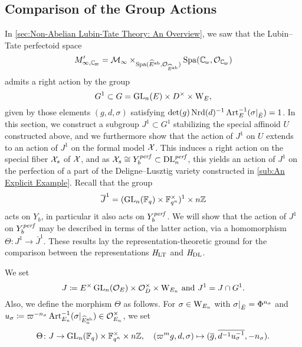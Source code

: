 \documentclass[../main.tex]{subfiles}
\begin{document}

\subsection{Comparison of the Group Actions} %
\label{sub:Proof of Proposition}
In \cref{sec:Non-Abelian Lubin-Tate Theory: An Overview}, we saw that
the Lubin--Tate perfectoid space 
$$M'_{\infty, \Cp} = \cM_{\infty} \times_{\Spa(\hat E^\ab, \cO_{\hat
E^\ab})} \Spa(\Cp, \cO_\Cp)$$ 
admits a right action by the group
\begin{equation*}
  G^1 \subset G = \operatorname{GL}_n(E) \times D^\times \times \mathrm W_E,
\end{equation*}
given by those elements $(g,d,\sigma)$ satisfying $\det(g) \operatorname{Nrd}(d)^{-1} \operatorname{Art}_E^{-1}(\sigma|_{\breve {E}}) = 1$.
In this section, we construct a subgroup $J^1 \subset G^1$ stabilizing the
special affinoid $U$ constructed above, and we furthermore show that 
the action of $J^1$ on $U$ extends to an action of $J^1$ on the formal model
$\mathcal{X}$. This induces a right action on the special fiber
$\mathcal{X}_s$ of $\mathcal{X}$, and as $\mathcal{X}_s \cong Y_b^{\mathit{perf}} \subset \mathrm{DL}_n^{\mathit{perf}}$, this
yields an action of $J^1$ on the perfection of a part of the Deligne--Lusztig
variety constructed in \cref{sub:An Explicit Example}. Recall that the group 
\begin{equation*}
  \overline J^1 = (\operatorname{GL}_n(\mathbb{F}_q) \times \mathbb{F}_{q^n}^\times)^1 \times n\mathbb{Z}
\end{equation*}
acts on $Y_b$, in particular it also acts on 
$Y_b^{\mathit{perf}}$. We will show that the action of $J^1$ on $Y_b^{\mathit{perf}}$
may be described in terms of the latter action, via a homomorphism
$\Theta\colon J^1 \to \bar J^1$. These
results lay the representation-theoretic ground for the comparison between the
representations $\mathit H_{\mathrm{LT}}$ and $\mathit H_\mathrm{DL}$.

We set 
\begin{equation} \label{eq:defJandJ1}
  J \coloneqq E^\times \operatorname{GL}_n(\mathcal{O}_E) \times \mathcal{O}_D^\times \times \mathrm W_{E_n}
  \text{ and } J^1 = J \cap G^1.
\end{equation}
Also, we define the morphism $\Theta$ as follows. For $\sigma \in \mathrm W_{E_n}$ with
$\sigma|_{\breve {E}} = \Phi^{n_\sigma}$ and $u_\sigma \coloneq \varpi^{-n_\sigma}
\operatorname{Art}^{-1}_{E_n}(\sigma|_{\widehat E_n^{\mathrm{ab}}}) \in \mathcal{O}_{E_n}^\times$, we set
\begin{equation}\label{eq:ThetaMorDef}
  \Theta \colon J \to \operatorname{GL}_n(\mathbb{F}_q) \times \mathbb{F}_{q^n}^\times \times {n\mathbb{Z}}, \quad
  (\varpi^m g,d,\sigma) \mapsto (\overline g, \overline {d^{-1}u_\sigma^{-1}}, -n_\sigma).
\end{equation}
\end{document}
